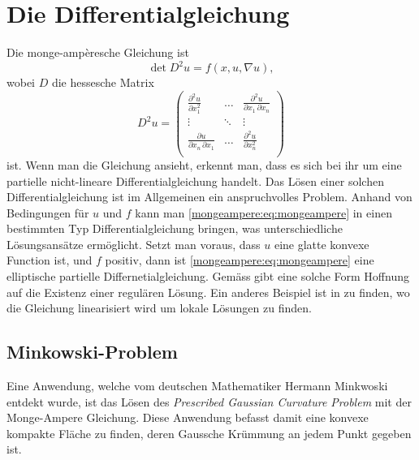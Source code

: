 %
%
%
%
\section{Die Differentialgleichung\label{mongeampere:section:teil0}}
Die monge-ampèresche Gleichung ist
\begin{equation}
  \det D^2 u = f(x, u, \nabla u),
  \label{mongeampere:eq:mongeampere}
\end{equation}
wobei $D$ die hessesche Matrix
\begin{equation}
  D^2 u =
  \begin{pmatrix}
    \frac{\partial^2 u}{\partial x_1^2} & \dots &\frac{\partial^2 u}{\partial x_1 \,\partial x_n} \\
  \vdots & \ddots & \vdots \\
  \frac{\partial u}{\partial x_n \,\partial x_1} & \dots &\frac{\partial^2 u}{\partial x_n^2} \\
  \end{pmatrix}
  \label{mongeampere:eq:hess}
\end{equation}
ist.
Wenn man die Gleichung ansieht, erkennt man, dass es sich bei ihr um eine partielle
nicht-lineare Differentialgleichung handelt.
Das Lösen einer solchen Differentialgleichung ist im Allgemeinen ein anspruchvolles Problem.
Anhand von Bedingungen für $u$ und $f$ kann man \eqref{mongeampere:eq:mongeampere} 
in einen bestimmten Typ Differentialgleichung bringen, was unterschiedliche Lösungsansätze ermöglicht.
Setzt man voraus, dass $u$ eine glatte konvexe Function ist, und $f$ positiv, dann ist \eqref{mongeampere:eq:mongeampere}
eine elliptische partielle Differnetialgleichung.
Gemäss \cite{mongeampere:figalli2018mongeampereequation} gibt eine solche Form Hoffnung auf die Existenz einer regulären Lösung.
Ein anderes Beispiel ist in \cite{mongeampere:figalli2022prescribednegativegausscurvature} zu finden, wo die 
Gleichung linearisiert wird um lokale Lösungen zu finden.

\subsection{Minkowski-Problem}
Eine Anwendung, welche vom deutschen Mathematiker Hermann Minkwoski entdekt wurde, ist das Lösen des
\emph{Prescribed Gaussian Curvature Problem} mit der Monge-Ampere Gleichung.
Diese Anwendung befasst damit eine konvexe kompakte Fläche zu finden, deren Gaussche Krümmung 
an jedem Punkt gegeben ist.

